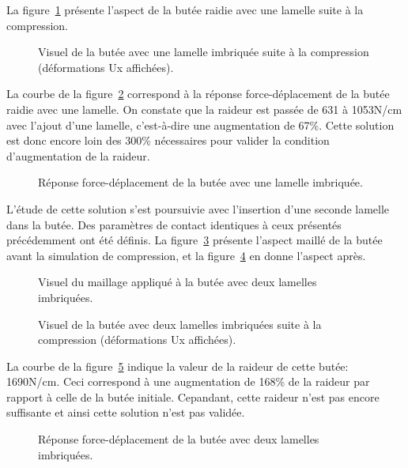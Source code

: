 ﻿\documentclass{article}
\begin{document}
La figure~\ref{fig8} présente l'aspect de la butée raidie avec une lamelle suite à la compression.

\begin{figure}[!h]
	\centering
	\caption{Visuel de la butée avec une lamelle imbriquée suite à la compression (déformations Ux affichées).}
	\label{fig8}
\end{figure}

La courbe de la figure~\ref{fig9} correspond à la réponse force-déplacement de la butée raidie avec une lamelle. On constate que la raideur est passée de 631 à 1053N/cm avec l'ajout d'une lamelle, c'est-à-dire une augmentation de 67\%. Cette solution est donc encore loin des 300\% nécessaires pour valider la condition d'augmentation de la raideur.

\begin{figure}[!h]
	\centering
	\caption{Réponse force-déplacement de la butée avec une lamelle imbriquée.}
	\label{fig9}
\end{figure}

L'étude de cette solution s'est poursuivie avec l'insertion d'une seconde lamelle dans la butée. Des paramètres de contact identiques à ceux présentés précédemment ont été définis. La figure~\ref{fig10} présente l'aspect maillé de la butée avant la simulation de compression, et la figure~\ref{fig11} en donne l'aspect après.

\begin{figure}[!h]
	\centering
	\caption{Visuel du maillage appliqué à la butée avec deux lamelles imbriquées.}
	\label{fig10}
\end{figure}

\begin{figure}[!h]
	\centering
	\caption{Visuel de la butée avec deux lamelles imbriquées suite à la compression (déformations Ux affichées).}
	\label{fig11}
\end{figure}

La courbe de la figure~\ref{fig12} indique la valeur de la raideur de cette butée: 1690N/cm. Ceci correspond à une augmentation de 168\% de la raideur par rapport à celle de la butée initiale. Cepandant, cette raideur n'est pas encore suffisante et ainsi cette solution n'est pas validée.
 
\begin{figure}[!h]
	\centering
	\caption{Réponse force-déplacement de la butée avec deux lamelles imbriquées.}
	\label{fig12}
\end{figure}
\end{document}

